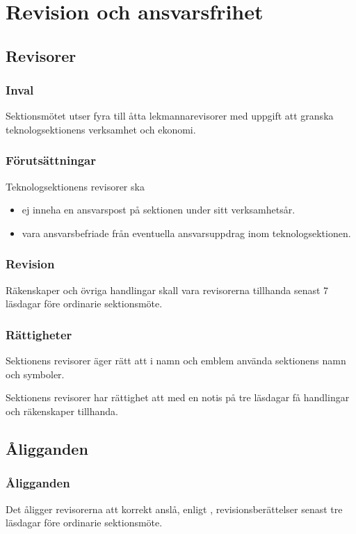 \section{Revision och ansvarsfrihet}

\subsection{Revisorer}

\subsubsection{Inval}
Sektionsmötet utser fyra till åtta lekmannarevisorer med uppgift att granska teknologsektionens verksamhet och ekonomi.

\subsubsection{Förutsättningar}
Teknologsektionens revisorer ska 
\begin{itemize}
    \item ej inneha en ansvarspost på sektionen under sitt verksamhetsår.
    \item vara ansvarsbefriade från eventuella ansvarsuppdrag inom teknologsektionen. 
\end{itemize} 

\subsubsection{Revision}
Räkenskaper och övriga handlingar skall vara revisorerna tillhanda senast 7 läsdagar före ordinarie sektionsmöte.

\subsubsection{Rättigheter}
Sektionens revisorer äger rätt att i namn och emblem använda sektionens namn och symboler.

Sektionens revisorer har rättighet att med en notis på tre läsdagar få handlingar och räkenskaper tillhanda.

\subsection{Åligganden}

\subsubsection{Åligganden}
Det åligger revisorerna att korrekt anslå, enligt , revisionsberättelser senast tre läsdagar före ordinarie sektionsmöte.

